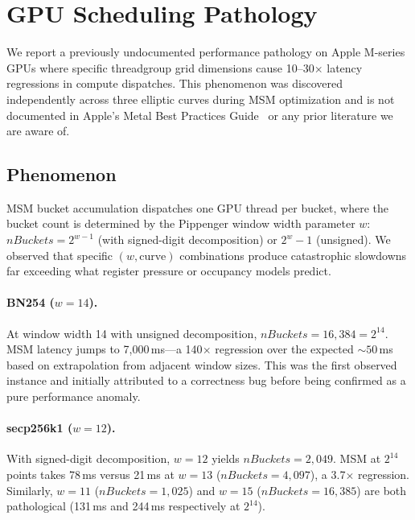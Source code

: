 
\section{GPU Scheduling Pathology}
\label{sec:scheduling}

We report a previously undocumented performance pathology on Apple M-series GPUs
where specific threadgroup grid dimensions cause 10--30$\times$ latency
regressions in compute dispatches. This phenomenon was discovered independently
across three elliptic curves during MSM optimization and is not documented in
Apple's Metal Best Practices Guide~\cite{apple-metal-best-practices} or any
prior literature we are aware of.

\subsection{Phenomenon}

MSM bucket accumulation dispatches one GPU thread per bucket, where the bucket
count is determined by the Pippenger window width parameter $w$:
$\mathit{nBuckets} = 2^{w-1}$ (with signed-digit decomposition) or $2^w - 1$
(unsigned). We observed that specific $(w, \text{curve})$ combinations produce
catastrophic slowdowns far exceeding what register pressure or occupancy models
predict.

\paragraph{BN254 ($w{=}14$).}
At window width 14 with unsigned decomposition, $\mathit{nBuckets} = 16{,}384 =
2^{14}$. MSM latency jumps to 7{,}000\,ms---a 140$\times$ regression over the
expected ${\sim}50$\,ms based on extrapolation from adjacent window sizes. This
was the first observed instance and initially attributed to a correctness bug
before being confirmed as a pure performance anomaly.

\paragraph{secp256k1 ($w{=}12$).}
With signed-digit decomposition, $w{=}12$ yields $\mathit{nBuckets} = 2{,}049$.
MSM at $2^{14}$ points takes 78\,ms versus 21\,ms at $w{=}13$ ($\mathit{nBuckets} =
4{,}097$), a 3.7$\times$ regression. Similarly, $w{=}11$ ($\mathit{nBuckets} = 1{,}025$)
and $w{=}15$ ($\mathit{nBuckets} = 16{,}385$) are both pathological (131\,ms and
244\,ms respectively at $2^{14}$).

